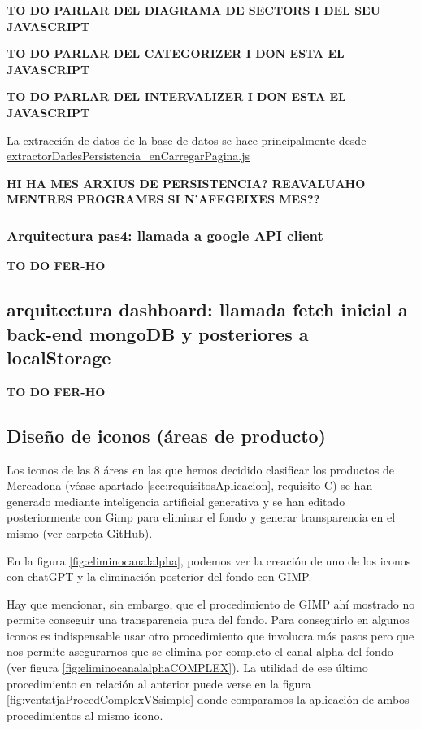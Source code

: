 \documentclass[a4paper,12pt]{report}
\begin{document}
	\textbf{TO DO PARLAR DEL DIAGRAMA DE SECTORS I DEL SEU JAVASCRIPT}
	
	\textbf{TO DO PARLAR DEL CATEGORIZER I DON ESTA EL JAVASCRIPT}
	
	\textbf{TO DO PARLAR DEL INTERVALIZER I DON ESTA EL JAVASCRIPT}
	
	
	
	La extracción de datos de la base de datos se hace principalmente desde \href{	https://github.com/blackcub3s/mercApp/blob/main/APP%20WEB/__frontend__produccio__/app/js/dashboard/extractorDadesPersistencia_enCarregarPagina.js}{extractorDadesPersistencia\_enCarregarPagina.js}
	
	\textbf{HI HA MES ARXIUS DE PERSISTENCIA? REAVALUAHO MENTRES PROGRAMES SI N'AFEGEIXES MES??}
	
	
	\subsubsection{Arquitectura pas4: llamada a google API client}
	\label{sec:pas4googleAPIclient}
	\textbf{TO DO FER-HO}
	
	\subsection{arquitectura dashboard: llamada fetch inicial a back-end mongoDB y posteriores a localStorage}
	\label{sec:dashboardFetchLocalStorage}
	\textbf{TO DO FER-HO}
	
	
	\subsection{Diseño de iconos (áreas de producto)}
	
	Los iconos de las 8 áreas en las que hemos decidido clasificar los productos de Mercadona (véase apartado \ref{sec:requisitosAplicacion}, requisito C) se han generado mediante inteligencia artificial generativa y se han editado posteriormente con Gimp para eliminar el fondo y generar transparencia en el mismo (ver \href{https://github.com/blackcub3s/mercApp/tree/main/creacioIconos/categoriesProductes}{carpeta GitHub}).
	
	
	En la figura \ref{fig:eliminocanalalpha}, podemos ver la creación de uno de los iconos con chatGPT y la eliminación posterior del fondo con GIMP. 
	
	Hay que mencionar, sin embargo, que el procedimiento de GIMP ahí mostrado no permite conseguir una transparencia pura del fondo. Para conseguirlo en algunos iconos es indispensable usar otro procedimiento que involucra más pasos pero que nos permite asegurarnos que se elimina por completo el canal alpha del fondo (ver figura \ref{fig:eliminocanalalphaCOMPLEX}). La utilidad de ese último procedimiento en relación al anterior puede verse en la figura \ref{fig:ventatjaProcedComplexVSsimple} donde comparamos la aplicación de ambos procedimientos al mismo icono.
\end{document}
